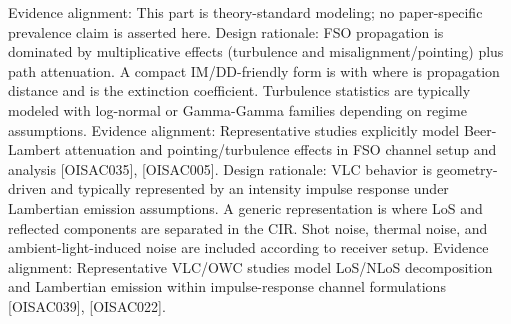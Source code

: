 {}Evidence alignment: This part is theory-standard modeling; no paper-specific prevalence claim is asserted here.\markdownRendererInterblockSeparator
{}
\markdownRendererSectionEnd \markdownRendererSectionBegin
{}\markdownRendererInterblockSeparator
{}Design rationale: FSO propagation is dominated by multiplicative effects (turbulence and misalignment/pointing) plus path attenuation.\markdownRendererParagraphSeparator
{}A compact IM/DD-friendly form is\markdownRendererSoftLineBreak
{}\markdownRendererSoftLineBreak
{}with\markdownRendererSoftLineBreak
{}\markdownRendererSoftLineBreak
{}where  is propagation distance and \markdownRendererInlineMath{\kappa} is the extinction coefficient. Turbulence statistics are typically modeled with log-normal or Gamma-Gamma families depending on regime assumptions.\markdownRendererParagraphSeparator
{}Evidence alignment: Representative studies explicitly model Beer-Lambert attenuation and pointing/turbulence effects in FSO channel setup and analysis [O\markdownRendererUnderscore{}ISAC\markdownRendererUnderscore{}035], [O\markdownRendererUnderscore{}ISAC\markdownRendererUnderscore{}005].\markdownRendererInterblockSeparator
{}
\markdownRendererSectionEnd \markdownRendererSectionBegin
{}\markdownRendererInterblockSeparator
{}Design rationale: VLC behavior is geometry-driven and typically represented by an intensity impulse response under Lambertian emission assumptions.\markdownRendererParagraphSeparator
{}A generic representation is\markdownRendererSoftLineBreak
{}\markdownRendererSoftLineBreak
{}where LoS and reflected components are separated in the CIR. Shot noise, thermal noise, and ambient-light-induced noise are included according to receiver setup.\markdownRendererParagraphSeparator
{}Evidence alignment: Representative VLC/OWC studies model LoS/NLoS decomposition and Lambertian emission within impulse-response channel formulations [O\markdownRendererUnderscore{}ISAC\markdownRendererUnderscore{}039], [O\markdownRendererUnderscore{}ISAC\markdownRendererUnderscore{}022].\markdownRendererInterblockSeparator
{}
\markdownRendererSectionEnd \markdownRendererSectionBegin
{}\markdownRendererInterblockSeparator
